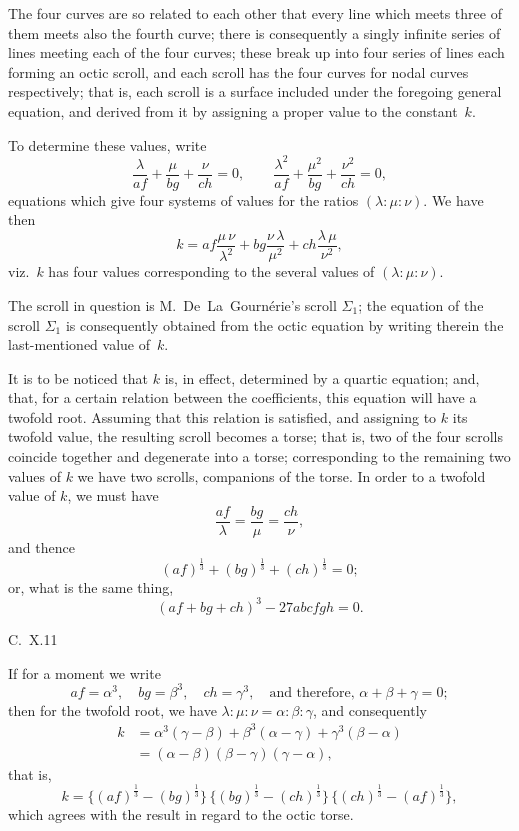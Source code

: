 \documentclass[12pt,a4paper]{article}
\theoremstyle{plain}
\begin{document}
The four curves are so related to each other that every line which meets three of them meets also the fourth curve; there is consequently a singly infinite series of lines meeting each of the four curves; these break up into four series of lines each forming an octic scroll, and each scroll has the four curves for nodal curves respectively; that is, each scroll is a surface included under the foregoing general equation, and derived from it by assigning a proper value to the constant~$k$.

To determine these values, write
\[
\frac{\lambda}{af} + \frac{\mu}{bg} + \frac{\nu}{ch} = 0, \qquad
\frac{\lambda^{2}}{af} + \frac{\mu^{2}}{bg} + \frac{\nu^{2}}{ch} = 0,
\]
equations which give four systems of values for the ratios $(\lambda : \mu : \nu)$. We have then
\[
k = af \frac{\mu\,\nu}{\lambda^{2}} + bg \frac{\nu\,\lambda}{\mu^{2}} + ch \frac{\lambda\,\mu}{\nu^{2}},
\]
viz.~$k$ has four values corresponding to the several values of $(\lambda : \mu : \nu)$.

The scroll in question is M.~De~La~Gourn\'{e}rie's scroll $\Sigma_{1}$; the equation of the scroll $\Sigma_{1}$ is consequently obtained from the octic equation by writing therein the last-mentioned value of~$k$.

It is to be noticed that $k$ is, in effect, determined by a quartic equation; and, that, for a certain relation between the coefficients, this equation will have a twofold root. Assuming that this relation is satisfied, and assigning to $k$ its twofold value, the resulting scroll becomes a torse; that is, two of the four scrolls coincide together and degenerate into a torse; corresponding to the remaining two values of $k$ we have two scrolls, companions of the torse. In order to a twofold value of $k$, we must have
\[
\frac{af}{\lambda} = \frac{bg}{\mu} = \frac{ch}{\nu},
\]
and thence
\[
(af)^{\frac{1}{3}} + (bg)^{\frac{1}{3}} + (ch)^{\frac{1}{3}} = 0;
\]
or, what is the same thing,
\[
(af + bg + ch)^{3} - 27abcfgh = 0.
\]

\medskip\noindent\textsc{C.~X.}\hfill 11

\newpage
\setcounter{page}{102}

If for a moment we write
\[
af = \alpha^{3}, \quad bg = \beta^{3}, \quad ch = \gamma^{3}, \quad \text{and therefore, } \alpha + \beta + \gamma = 0;
\]
then for the twofold root, we have $\lambda : \mu : \nu = \alpha : \beta : \gamma$, and consequently
\begin{align*}
k &= \alpha^{3}(\gamma - \beta) + \beta^{3}(\alpha - \gamma) + \gamma^{3}(\beta - \alpha) \\
&= (\alpha - \beta)(\beta - \gamma)(\gamma - \alpha),
\end{align*}
that is,
\[
k = \{(af)^{\frac{1}{3}} - (bg)^{\frac{1}{3}}\}\,\{(bg)^{\frac{1}{3}} - (ch)^{\frac{1}{3}}\}\,\{(ch)^{\frac{1}{3}} - (af)^{\frac{1}{3}}\},
\]
which agrees with the result in regard to the octic torse.
\end{document}
